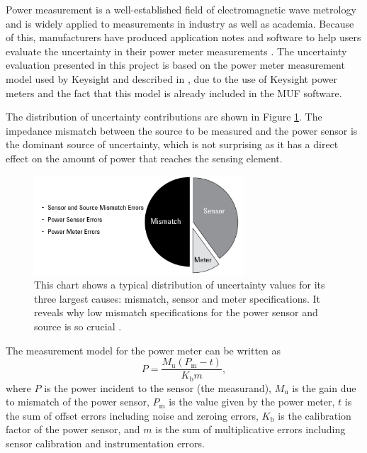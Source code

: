\documentclass[../thesis/thesis.tex]{subfiles}
\begin{document}
Power measurement is a well-established field of electromagnetic wave metrology and is widely applied to measurements in industry as well as academia. Because of this, manufacturers have produced application notes and software to help users evaluate the uncertainty in their power meter measurements \cite{Rohde_2001, Keysight_2017}. The uncertainty evaluation presented in this project is based on the power meter measurement model used by Keysight and described in \cite{Keysight_2017}, due to the use of Keysight power meters and the fact that this model is already included in the MUF software.

The distribution of uncertainty contributions are shown in Figure \ref{ch4_fig_pmchart}. The impedance mismatch between the source to be measured and the power sensor is the dominant source of uncertainty, which is not surprising as it has a direct effect on the amount of power that reaches the sensing element.

\begin{figure}
	\centering
	\includegraphics[width=0.7\textwidth]{pmchart.png}
	\caption[A chart showing dominant uncertainty contributions within the power meter measurement.]{This chart shows a typical distribution of uncertainty values for its three largest causes: mismatch, sensor and meter specifications. It reveals why low mismatch specifications for the power sensor and source is so crucial \cite{Keysight_2017}.}
	\label{ch4_fig_pmchart}
\end{figure}

The measurement model for the power meter can be written as
\begin{equation}
	P = \frac{M_\textrm{u}(P_\textrm{m}-t)}{K_\textrm{b}m},
\end{equation}
where $P$ is the power incident to the sensor (the measurand), $M_\textrm{u}$ is the gain due to mismatch of the power sensor, $P_\textrm{m}$ is the value given by the power meter, $t$ is the sum of offset errors including noise and zeroing errors, $K_\textrm{b}$ is the calibration factor of the power sensor, and $m$ is the sum of multiplicative errors including sensor calibration and instrumentation errors.
\end{document}
